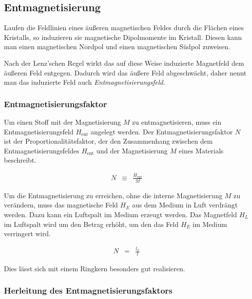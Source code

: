 \documentclass[12pt,a4paper]{scrartcl}
\numberwithin{equation}{section} %
\renewcommand{\[}{} %
\renewcommand{\]}{\noindent} %
\begin{document}
\hypertarget{entmagnetisierung}{%
\subsection{Entmagnetisierung}\label{entmagnetisierung}}

Laufen die Feldlinien eines äußeren magnetischen Feldes durch die
Flächen eines Kristalls, so induzieren sie magnetische Dipolmomente im
Kristall. Diesen kann man einen magnetischen Nordpol und einen
magnetischen Südpol zuweisen.

Nach der Lenz'schen Regel wirkt das auf diese Weise induzierte
Magnetfeld dem äußeren Feld entgegen. Dadurch wird das äußere Feld
abgeschwächt, daher nennt man das induzierte Feld auch
\emph{Entmagnetisierungsfeld}.

\hypertarget{entmagnetisierungsfaktor}{%
\subsubsection{Entmagnetisierungsfaktor}\label{entmagnetisierungsfaktor}}

Um einen Stoff mit der Magnetisierung \(M\) zu entmagnetisieren, muss
ein Entmagnetisierungsfeld \(H_\mathrm{ent}\) angelegt werden. Der
Entmagnetisierungsfaktor \(N\) ist der Proportionalitätsfaktor, der den
Zusammenhang zwischen dem Entmagnetisierungsfeldes \(H_\mathrm{ent}\)
und der Magnetisierung \(M\) eines Materials beschreibt.

\[
\begin{eqnarray}
    N &\equiv& \frac{H_\mathrm{ent}}{M} \label{defN}
\end{eqnarray}
\]

Um die Entmagnetisierung zu erreichen, ohne die interne Magnetisierung
\(M\) zu verändern, muss das magnetische Feld \(H_E\) aus dem Medium in
Luft verdrängt werden. Dazu kann ein Luftspalt im Medium erzeugt werden.
Das Magnetfeld \(H_L\) im Luftspalt wird um den Betrag erhöht, um den
das Feld \(H_E\) im Medium verringert wird.

\[
\begin{eqnarray}
    N &=& \frac{l_L}{l} \label{N}
\end{eqnarray}
\]

Dies lässt sich mit einem Ringkern besonders gut realisieren.

\hypertarget{herleitung-des-entmagnetisierungsfaktors}{%
\subsubsection{Herleitung des
Entmagnetisierungsfaktors}\label{herleitung-des-entmagnetisierungsfaktors}}
\end{document}
